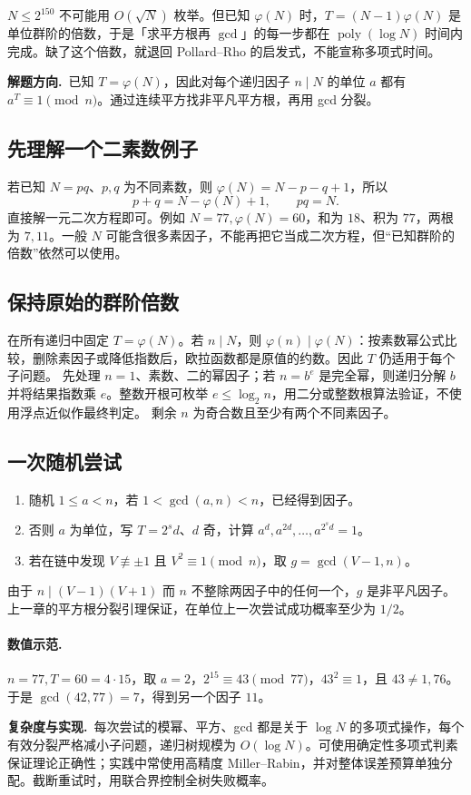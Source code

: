 \documentclass[UTF8,a4paper,11pt,twoside,openright,fontset=fandol]{ctexbook}
\theoremstyle{definition}
\newcommand{\hint}{\par\noindent\textbf{解题方向.}\ }
\newcommand{\cost}{\par\noindent\textbf{复杂度与实现.}\ }
\begin{document}
\begin{tip}
$N\le2^{150}$ 不可能用 $O(\sqrt N)$ 枚举。但已知 $\varphi(N)$ 时，$T=(N-1)\varphi(N)$ 是单位群阶的倍数，于是「求平方根再 $\gcd$」的每一步都在 $\operatorname{poly}(\log N)$ 时间内完成。缺了这个倍数，就退回 Pollard--Rho 的启发式，不能宣称多项式时间。
\end{tip}

\hint 已知 $T=\varphi(N)$，因此对每个递归因子 $n\mid N$ 的单位 $a$ 都有 $a^T\equiv1\pmod n$。通过连续平方找非平凡平方根，再用 gcd 分裂。


\subsection{先理解一个二素数例子}
若已知 $N=pq$、$p,q$ 为不同素数，则 $\varphi(N)=N-p-q+1$，所以
\[
 p+q=N-\varphi(N)+1,\qquad pq=N.
\]
直接解一元二次方程即可。例如 $N=77,\varphi(N)=60$，和为 $18$、积为 $77$，两根为 $7,11$。一般 $N$ 可能含很多素因子，不能再把它当成二次方程，但“已知群阶的倍数”依然可以使用。

\subsection{保持原始的群阶倍数}
在所有递归中固定 $T=\varphi(N)$。若 $n\mid N$，则 $\varphi(n)\mid\varphi(N)$：按素数幂公式比较，删除素因子或降低指数后，欧拉函数都是原值的约数。因此 $T$ 仍适用于每个子问题。
先处理 $n=1$、素数、二的幂因子；若 $n=b^e$ 是完全幂，则递归分解 $b$ 并将结果指数乘 $e$。整数开根可枚举 $e\le\log_2n$，用二分或整数根算法验证，不使用浮点近似作最终判定。
剩余 $n$ 为奇合数且至少有两个不同素因子。

\subsection{一次随机尝试}
\begin{enumerate}
\item 随机 $1\le a<n$，若 $1<\gcd(a,n)<n$，已经得到因子。
\item 否则 $a$ 为单位，写 $T=2^sd$、$d$ 奇，计算 $a^d,a^{2d},\ldots,a^{2^sd}=1$。
\item 若在链中发现 $V\not\equiv\pm1$ 且 $V^2\equiv1\pmod n$，取 $g=\gcd(V-1,n)$。
\end{enumerate}
由于 $n\mid(V-1)(V+1)$ 而 $n$ 不整除两因子中的任何一个，$g$ 是非平凡因子。上一章的平方根分裂引理保证，在单位上一次尝试成功概率至少为 $1/2$。

\paragraph{数值示范.} $n=77,T=60=4\cdot15$，取 $a=2$，$2^{15}\equiv43\pmod{77}$，$43^2\equiv1$，且 $43\ne1,76$。于是 $\gcd(42,77)=7$，得到另一个因子 $11$。
\cost 每次尝试的模幂、平方、gcd 都是关于 $\log N$ 的多项式操作，每个有效分裂严格减小子问题，递归树规模为 $O(\log N)$。可使用确定性多项式判素保证理论正确性；实践中常使用高精度 Miller--Rabin，并对整体误差预算单独分配。截断重试时，用联合界控制全树失败概率。
\end{document}

